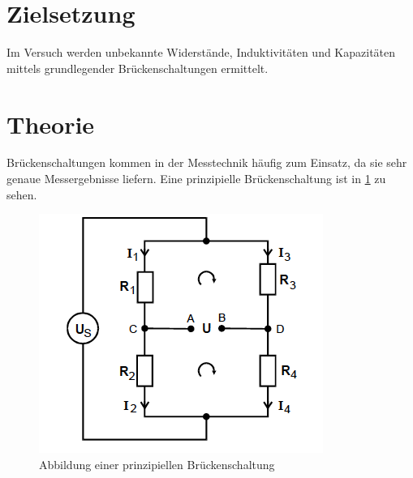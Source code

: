 \section{Zielsetzung}
Im Versuch werden unbekannte Widerstände, Induktivitäten und Kapazitäten mittels
grundlegender Brückenschaltungen ermittelt.

\section{Theorie}
Brückenschaltungen kommen in der Messtechnik häufig zum Einsatz, da sie sehr genaue
Messergebnisse liefern.
Eine prinzipielle Brückenschaltung ist in \ref{Abb1} zu sehen.

\begin{figure}
  \centering
  \includegraphics[scale=0.7]{Bruecke1.PNG}
  \caption{Abbildung einer prinzipiellen Brückenschaltung \cite{Quelle}}
  \label{Abb1}
\end{figure}
\FloatBarrier

